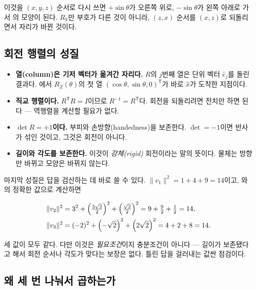 이것을 $(x, y, z)$ 순서로 다시 쓰면 $+\sin\theta$가 오른쪽 위로, $-\sin\theta$가
왼쪽 아래로 가서 의 모양이 된다. $R_Y$만 부호가 다른 것이 아니라,
$(z, x)$ 순서를 $(x, z)$로 되돌리면서 자리가 바뀐 것이다.

\subsection{회전 행렬의 성질}
\label{sec:hw2-bg-props}

\begin{itemize}
  \item \textbf{열(column)은 기저 벡터가 옮겨간 자리다.} $R$의 $j$번째 열은
        단위 벡터 $\hat{e}_j$를 돌린 결과다. 에서
        $R_Z(\theta)$의 첫 열 $(\cos\theta, \sin\theta, 0)^{\mathsf{T}}$가
        바로 $\hat{x}$가 도착한 지점이다.
  \item \textbf{직교 행렬이다.} $R^{\mathsf{T}}R = I$이므로
        $R^{-1} = R^{\mathsf{T}}$다. 회전을 되돌리려면 전치만 하면 된다 ---
        역행렬을 계산할 필요가 없다.
  \item \textbf{$\det R = +1$이다.} 부피와 손방향(handedness)을 보존한다.
        $\det = -1$이면 반사가 섞인 것이고, 그것은 회전이 아니다.
  \item \textbf{길이와 각도를 보존한다.} 이것이 \emph{강체(rigid)} 회전이라는 말의
        뜻이다. 물체는 방향만 바뀌고 모양은 바뀌지 않는다.
\end{itemize}

마지막 성질은 답을 검산하는 데 바로 쓸 수 있다. $\lVert v_1 \rVert^2
= 1 + 4 + 9 = 14$이고, 와 의 정확한 값으로
계산하면

\begin{align}
\label{eq:hw2-bg-norm}
\lVert v_2 \rVert^2 &= 3^2 + \left(\tfrac{3\sqrt{2}}{2}\right)^2
                       + \left(\tfrac{\sqrt{2}}{2}\right)^2
                     = 9 + \tfrac{9}{2} + \tfrac{1}{2} = 14, \\
\lVert v_3 \rVert^2 &= (-2)^2 + \left(-\sqrt{2}\right)^2
                       + \left(2\sqrt{2}\right)^2
                     = 4 + 2 + 8 = 14 . \notag
\end{align}

세 값이 모두 같다. 다만 이것은 \emph{필요조건}이지 충분조건이 아니다 --- 길이가
보존됐다고 해서 회전 순서나 각도가 맞다는 보장은 없다. 틀린 답을 걸러내는 값싼
점검이다.

\subsection{왜 세 번 나눠서 곱하는가}
\label{sec:hw2-bg-euler}

